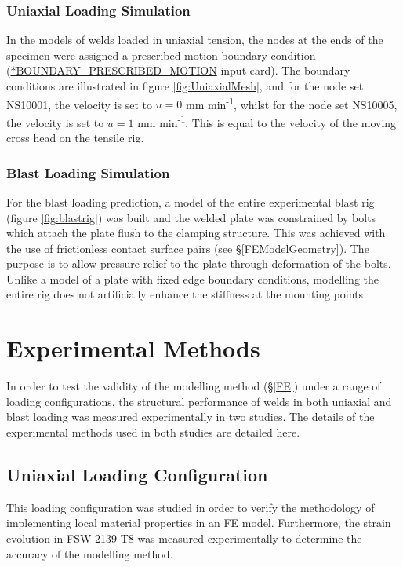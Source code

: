 \subsubsection{Uniaxial Loading Simulation}
In the models of welds loaded in uniaxial tension, the nodes at the ends of the specimen were assigned a prescribed motion boundary condition (\url{*BOUNDARY_PRESCRIBED_MOTION} input card). The boundary conditions are illustrated in figure \ref{fig:UniaxialMesh}, and for the node set %
NS10001, the velocity is set to \textit{$u=0$} mm min\textsuperscript{-1}, whilst for the node set
NS10005, the velocity is set to \textit{$u=1$} mm min\textsuperscript{-1}. This is equal to the velocity of the moving cross head on the tensile rig.
\subsubsection{Blast Loading Simulation}
For the blast loading prediction, a model of the entire experimental blast rig (figure \ref{fig:blastrig}) was built and the welded plate was constrained by bolts which attach the plate flush to the clamping structure. This was achieved with the use of frictionless contact surface pairs (see \S\ref{FEModelGeometry}). The purpose is to allow pressure relief to the plate through deformation of the bolts. Unlike a model of a plate with fixed edge boundary conditions, modelling the entire rig does not artificially enhance the stiffness at the mounting points

\section{Experimental Methods}
\label{EM}
In order to test the validity of the modelling method (\S\ref{FE}) under a range of loading configurations, the structural performance of welds in both uniaxial and blast loading was measured experimentally in two studies. The details of the experimental methods used in both studies are detailed here.

\subsection{Uniaxial Loading Configuration}
\label{EMUniaxialLoading}
This loading configuration was studied in order to verify the methodology of implementing local material properties in an FE model. Furthermore, the strain evolution in FSW 2139-T8 was measured experimentally to determine the accuracy of the modelling method. 
